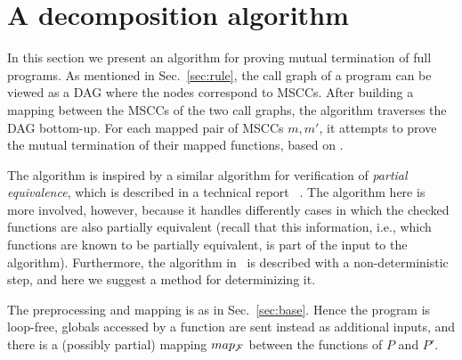 \section{A decomposition algorithm}
\label{sec:decomposition}

In this section we present an algorithm for proving mutual termination of full programs.
As mentioned in Sec.~\ref{sec:rule}, the call graph of a program can be viewed
as a DAG where the nodes correspond to MSCCs. After building a mapping between the MSCCs of the two call graphs, the algorithm traverses the DAG
bottom-up. For each mapped pair of MSCCs $m,m'$, it attempts to prove the mutual termination of their mapped functions, based on \mtermdp.

The algorithm is inspired by a similar algorithm for verification of \emph{partial
equivalence}, which is described in a technical report~\cite{GS11}
. The algorithm here is more involved, however,
because it handles differently cases in which the checked functions are also
partially equivalent (recall that this information, i.e., which functions are
known to be partially equivalent, is part of the input to the algorithm).
Furthermore, the algorithm in~\cite{GS11} is described with a non-deterministic
step, and here we suggest a method for determinizing it.

The preprocessing and mapping is as in Sec.~\ref{sec:base}. Hence the program is loop-free, globals accessed by a function are sent instead as additional inputs, and there is a (possibly partial) mapping $map_{\cal F}$ between the functions of $P$ and $P'$.



